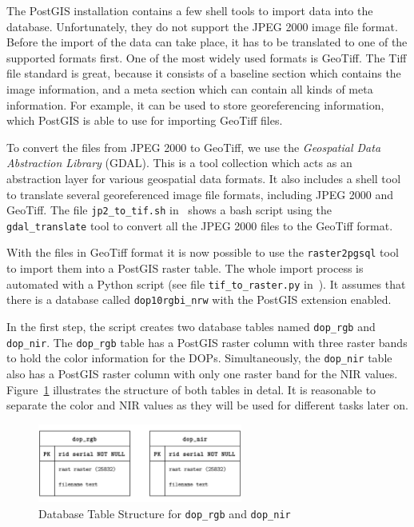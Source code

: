 The PostGIS installation contains a few shell tools to import data into the database. Unfortunately, they do not support the JPEG 2000 image file format. Before the import of the data can take place, it has to be translated to one of the supported formats first. One of the most widely used formats is GeoTiff. The Tiff file standard is great, because it consists of a baseline section which contains the image information, and a meta section which can contain all kinds of meta information. For example, it can be used to store georeferencing information, which PostGIS is able to use for importing GeoTiff files.

To convert the files from JPEG 2000 to GeoTiff, we use the \emph{Geospatial Data Abstraction Library} (GDAL). This is a tool collection which acts as an abstraction layer for various geospatial data formats. It also includes a shell tool to translate several georeferenced image file formats, including JPEG 2000 and GeoTiff. The file \texttt{jp2\_to\_tif.sh} in~\cite{thesis-code20} shows a bash script using the \texttt{gdal\_translate} tool to convert all the JPEG 2000 files to the GeoTiff format.

With the files in GeoTiff format it is now possible to use the \texttt{raster2pgsql} tool to import them into a PostGIS raster table. The whole import process is automated with a Python script (see file \texttt{tif\_to\_raster.py} in~\cite{thesis-code20}). It assumes that there is a database called \texttt{dop10rgbi\_nrw} with the PostGIS extension enabled.

In the first step, the script creates two database tables named \texttt{dop\_rgb} and \texttt{dop\_nir}. The \texttt{dop\_rgb} table has a PostGIS raster column with three raster bands to hold the color information for the DOPs. Simultaneously, the \texttt{dop\_nir} table also has a PostGIS raster column with only one raster band for the NIR values. Figure~\ref{fig:dop_entities} illustrates the structure of both tables in detal. It is reasonable to separate the color and NIR values as they will be used for different tasks later on.

\begin{figure}[h]
    \centering
    \includegraphics[width=0.6\textwidth]{images/dop_entities}
    \caption{Database Table Structure for \texttt{dop\_rgb} and \texttt{dop\_nir}}
    \label{fig:dop_entities}
\end{figure}

